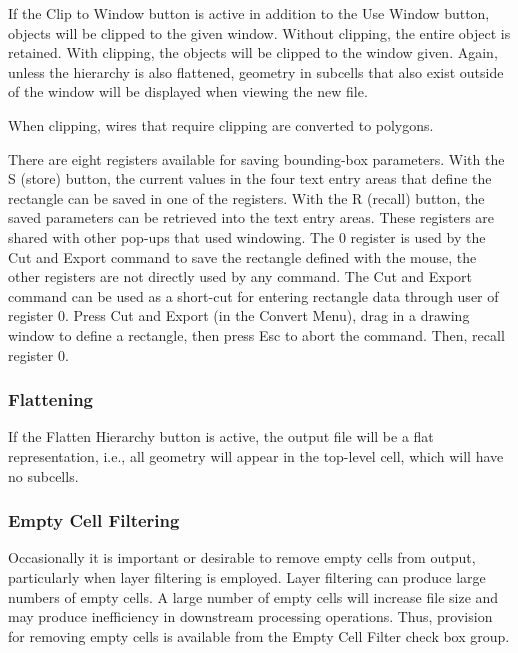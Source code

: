 If the {\cb Clip to Window} button is active in addition to the {\cb
Use Window} button, objects will be clipped to the given window. 
Without clipping, the entire object is retained.  With clipping, the
objects will be clipped to the window given.  Again, unless the
hierarchy is also flattened, geometry in subcells that also exist
outside of the window will be displayed when viewing the new file.

When clipping, wires that require clipping are converted to polygons.

There are eight registers available for saving bounding-box
parameters.  With the {\cb S} (store) button, the current values in
the four text entry areas that define the rectangle can be saved in
one of the registers.  With the {\cb R} (recall) button, the saved
parameters can be retrieved into the text entry areas.  These
registers are shared with other pop-ups that used windowing.  The 0
register is used by the {\cb Cut and Export} command to save the
rectangle defined with the mouse, the other registers are not directly
used by any command.  The {\cb Cut and Export} command can be used as
a short-cut for entering rectangle data through user of register 0. 
Press {\cb Cut and Export} (in the {\cb Convert Menu}), drag in a
drawing window to define a rectangle, then press {\kb Esc} to abort
the command.  Then, recall register 0.

\subsubsection{Flattening}

If the {\cb Flatten Hierarchy} button is active, the output file will
be a flat representation, i.e., all geometry will appear in the
top-level cell, which will have no subcells.

\subsubsection{Empty Cell Filtering}
\label{ecfilt}

Occasionally it is important or desirable to remove empty cells from
output, particularly when layer filtering is employed.  Layer
filtering can produce large numbers of empty cells.  A large number of
empty cells will increase file size and may produce inefficiency in
downstream processing operations.  Thus, provision for removing empty
cells is available from the {\cb Empty Cell Filter} check box group.

